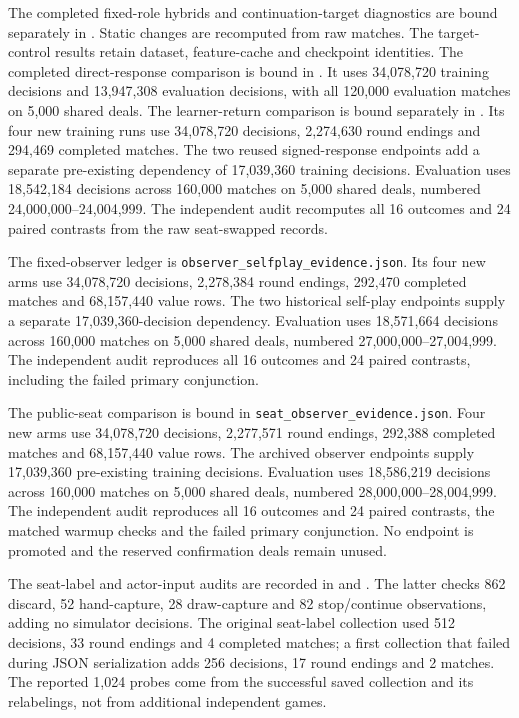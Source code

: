 The completed fixed-role hybrids and continuation-target diagnostics are bound
separately in . Static changes
are recomputed from raw matches. The target-control results retain dataset,
feature-cache and checkpoint identities. The completed direct-response comparison is bound in
. It uses 34,078,720 training
decisions and 13,947,308 evaluation decisions, with all 120,000 evaluation
matches on 5,000 shared deals. The learner-return comparison is bound separately
in . Its four new training runs
use 34,078,720 decisions, 2,274,630 round endings and 294,469 completed matches.
The two reused signed-response endpoints add a separate pre-existing dependency
of 17,039,360 training decisions. Evaluation uses 18,542,184 decisions across
160,000 matches on 5,000 shared deals, numbered 24,000,000--24,004,999.
The independent audit recomputes all 16 outcomes and 24 paired contrasts from
the raw seat-swapped records.

The fixed-observer ledger is \texttt{observer\_selfplay\_evidence.json}.
Its four new arms
use 34,078,720 decisions, 2,278,384 round endings, 292,470 completed matches and
68,157,440 value rows. The two historical self-play endpoints supply a separate
17,039,360-decision dependency. Evaluation uses 18,571,664 decisions across
160,000 matches on 5,000 shared deals, numbered 27,000,000--27,004,999. The
independent audit reproduces all 16 outcomes and 24 paired contrasts, including
the failed primary conjunction.

The public-seat comparison is bound in \texttt{seat\_observer\_evidence.json}.
Four new arms use 34,078,720 decisions, 2,277,571 round endings,
292,388 completed matches and 68,157,440 value rows. The archived observer
endpoints supply 17,039,360 pre-existing training decisions. Evaluation uses
18,586,219 decisions across 160,000 matches on 5,000 shared deals, numbered
28,000,000--28,004,999. The independent audit reproduces all 16 outcomes and
24 paired contrasts, the matched warmup checks and the failed primary
conjunction. No endpoint is promoted and the reserved confirmation deals remain
unused.

The seat-label and actor-input audits are recorded in
 and
. The latter checks 862
discard, 52 hand-capture, 28 draw-capture and 82 stop/continue observations,
adding no simulator decisions. The original seat-label collection used 512
decisions, 33 round endings and 4 completed matches; a first collection that
failed during JSON serialization adds 256 decisions, 17 round endings and
2 matches. The reported 1,024 probes come from the successful saved collection
and its relabelings, not from additional independent games.


